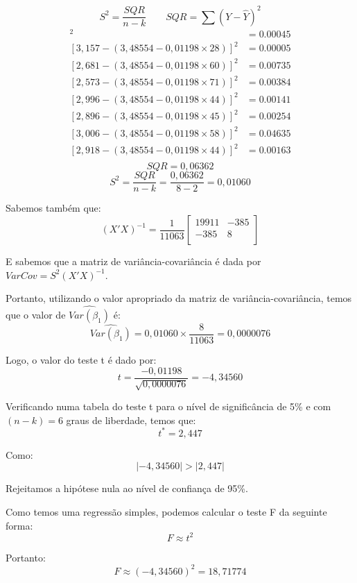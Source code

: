 \documentclass[]{ufpe-exercises}
\begin{document}
\begin{questions}
\begin{parts}
\begin{solution}
			\[
				S^{2} = \frac{SQR}{n - k} \qquad
				SQR = \sum (Y - \hat{Y})^{2}
			\]
			\begin{align*}
				[3.045 - (3,48554 - 0,01198 \times 35)]^{2} & = 0.00045 \\
				[3,157 - (3,48554 - 0,01198 \times 28)]^{2} & = 0.00005 \\
				[2,681 - (3,48554 - 0,01198 \times 60)]^{2} & = 0.00735 \\
				[2,573 - (3,48554 - 0,01198 \times 71)]^{2} & = 0.00384 \\
				[2,996 - (3,48554 - 0,01198 \times 44)]^{2} & = 0.00141 \\
				[2,896 - (3,48554 - 0,01198 \times 45)]^{2} & = 0.00254 \\
				[3,006 - (3,48554 - 0,01198 \times 58)]^{2} & = 0.04635 \\
				[2,918 - (3,48554 - 0,01198 \times 44)]^{2} & = 0.00163 \\
			\end{align*}
			\[ SQR = 0,06362 \]
			\[ S^{2} = \frac{SQR}{n - k} = \frac{0,06362}{8 - 2} = 0,01060 \]

			Sabemos também que:
			\[
				(X'X)^{-1} = \frac{1}{11063}
				\begin{bmatrix}
					19911 & -385 \\
					-385  & 8    \\
				\end{bmatrix}
			\]

			E sabemos que a matriz de variância-covariância é dada por \(VarCov = S^{2}(X'X)^{-1}\).

			Portanto, utilizando o valor apropriado da matriz de variância-covariância, temos que o valor de \(\widehat{Var(\beta_{1})}\) é:
			\[\widehat{Var(\beta_{1})} = 0,01060 \times \frac{8}{11063} = 0,0000076\]

			Logo, o valor do teste t é dado por:
			\[ t = \frac{-0,01198}{\sqrt{0,0000076}} = -4,34560 \]

			Verificando numa tabela do teste t para o nível de significância de 5\% e com \((n - k) = 6\) graus de liberdade, temos que:
			\[ t^{*} = 2,447 \]

			Como:
			\[\lvert -4,34560 \rvert > \lvert 2,447 \rvert\]

			Rejeitamos a hipótese nula ao nível de confiança de 95\%.

			Como temos uma regressão simples, podemos calcular o teste F da seguinte forma:
			\[ F \approx t^{2} \]

			Portanto:
			\[ F \approx (-4,34560)^{2} = 18,71774 \]


\end{solution}
\end{parts}
\end{questions}
\end{document}

